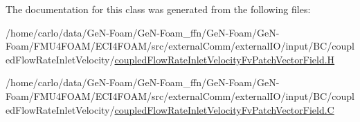 The documentation for this class was generated from the following files\+:\begin{DoxyCompactItemize}
\item 
/home/carlo/data/\+Ge\+N-\/\+Foam/\+Ge\+N-\/\+Foam\+\_\+ffn/\+Ge\+N-\/\+Foam/\+Ge\+N-\/\+Foam/\+F\+M\+U4\+F\+O\+A\+M/\+E\+C\+I4\+F\+O\+A\+M/src/external\+Comm/external\+I\+O/input/\+B\+C/coupled\+Flow\+Rate\+Inlet\+Velocity/\hyperlink{coupledFlowRateInletVelocityFvPatchVectorField_8H}{coupled\+Flow\+Rate\+Inlet\+Velocity\+Fv\+Patch\+Vector\+Field.\+H}\item 
/home/carlo/data/\+Ge\+N-\/\+Foam/\+Ge\+N-\/\+Foam\+\_\+ffn/\+Ge\+N-\/\+Foam/\+Ge\+N-\/\+Foam/\+F\+M\+U4\+F\+O\+A\+M/\+E\+C\+I4\+F\+O\+A\+M/src/external\+Comm/external\+I\+O/input/\+B\+C/coupled\+Flow\+Rate\+Inlet\+Velocity/\hyperlink{coupledFlowRateInletVelocityFvPatchVectorField_8C}{coupled\+Flow\+Rate\+Inlet\+Velocity\+Fv\+Patch\+Vector\+Field.\+C}\end{DoxyCompactItemize}
